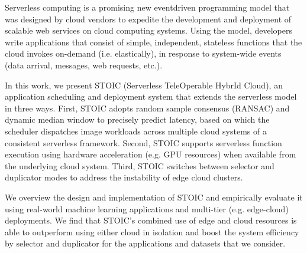 Serverless computing is a promising new eventdriven
programming model that was designed by cloud vendors
to expedite the development and deployment of scalable web
services on cloud computing systems. Using the model, developers write applications that consist of simple, independent, stateless functions that the cloud invokes on-demand (i.e. elastically), in response to system-wide events (data arrival, messages, web requests, etc.).

In this work, we present STOIC (Serverless TeleOperable HybrId Cloud), an application scheduling and deployment system that extends the serverless model in three ways. First, STOIC adopts random sample consensus (RANSAC) and dynamic median window to precisely predict latency, based on which the scheduler dispatches image workloads across multiple cloud systems of a consistent serverless framework. Second, STOIC supports serverless function execution using hardware acceleration (e.g. GPU resources) when available from the underlying cloud system. Third, STOIC switches between selector and duplicator modes to address the instability of edge cloud clusters. 

We overview the design and implementation of STOIC and empirically evaluate it using real-world machine learning applications and multi-tier (e.g. edge-cloud) deployments. We find that STOIC's combined use of edge and cloud resources is able to outperform using either cloud in isolation and boost the system efficiency by selector and duplicator for the applications and datasets that we consider.


